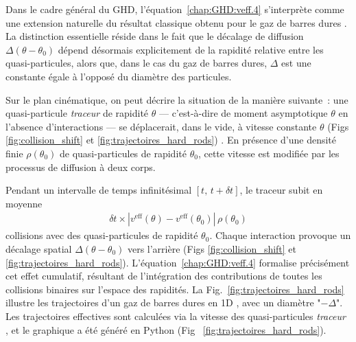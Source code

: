 Dans le cadre général du \gls{GHD}, l’équation~\eqref{chap:GHD:veff.4} s’interprète comme une extension naturelle du résultat classique obtenu pour le gaz de barres dures \cite{Percus1976,Boldrighini1983}. La distinction essentielle réside dans le fait que le décalage de diffusion \(\Delta(\theta - \theta_0)\) dépend désormais explicitement de la rapidité relative entre les quasi-particules, alors que, dans le cas du gaz de barres dures, \(\Delta\) est une constante égale à l’opposé du diamètre des particules.

\medskip


Sur le plan cinématique, on peut décrire la situation de la manière suivante~: une quasi-particule \emph{traceur} de rapidité \(\theta\) --- c’est-à-dire de moment asymptotique \(\theta\) en l’absence d’interactions --- se déplacerait, dans le vide, à vitesse constante \( \theta \) (Figs \ref{fig:collision_shift} et \ref{fig:trajectoires_hard_rods}) . En présence d’une densité finie \(\rho(\theta_0)\) de quasi-particules de rapidité \(\theta_0\), cette vitesse est modifiée par les processus de diffusion à deux corps.

\medskip


Pendant un intervalle de temps infinitésimal \([t,\, t + \delta t]\), le traceur subit en moyenne
\begin{eqnarray}
	\delta t \times \left| v^{\mathrm{eff}}(\theta) - v^{\mathrm{eff}}(\theta_0) \right| \, \rho(\theta_0)
\end{eqnarray}
collisions avec des quasi-particules de rapidité \(\theta_0\). Chaque interaction provoque un décalage spatial \(\Delta(\theta - \theta_0)\) vers l’arrière (Figs \ref{fig:collision_shift} et \ref{fig:trajectoires_hard_rods}). L’équation~\eqref{chap:GHD:veff.4} formalise précisément cet effet cumulatif, résultant de l’intégration des contributions de toutes les collisions binaires sur l’espace des rapidités. La Fig.~\ref{fig:trajectoires_hard_rods} illustre les trajectoires d’un gaz de barres dures en 1D \cite{Percus1976,Boldrighini1983}, avec un diamètre "\(-\Delta\)". Les trajectoires effectives sont calculées via la vitesse des quasi-particules \emph{traceur}
, et le graphique a été généré en Python (Fig~	\ref{fig:trajectoires_hard_rods}).


